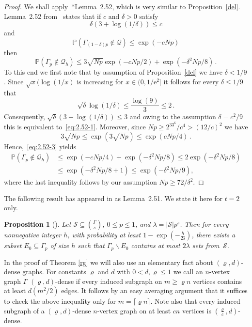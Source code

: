 \documentclass[reqno, 12pt]{amsart}
\let\setminus=\smallsetminus
\newcommand{\PP}{\mathds{P}}
\newtheorem{prop}[theorem]{Proposition}
\let\rho=\varrho
\def\PP{\mathds P}
\def\cQ{{\mathcal Q}}
\begin{document}
\begin{proof}
We shall apply~\cite{JLR}*{Lemma~2.52}, which is very similar to Proposition~\ref{del}. Lemma~2.52 from~\cite{JLR} states
that if $c$ and $\delta>0$ satisfy
\begin{equation}\label{eq:2.52-1}
    \delta(3+\log(1/\delta))\leq c
\end{equation}
and
\[
    \PP(\Gamma_{(1-\delta)p}\not\in\cQ)\le\exp(-cNp)
\]
then
\begin{equation}\label{eq:2.52-3}
    \PP(\Gamma_p\not\in\cQ_h)\le3\sqrt{Np}\exp(-cNp/2)+\exp(-\delta^2Np/8)\,.
\end{equation}
To this end we first note that by assumption of Proposition~\ref{del} we have $\delta <1/9$. Since
$\sqrt{x}(\log(1/x)$ is increasing for $x\in(0,1/\textrm{e}^2]$ it follows for every $\delta\le1/9$
that
\[
    \sqrt{\delta}\log(1/\delta)\leq\frac{\log(9)}{3} \leq 2\,.
\]
Consequently, $\sqrt{\delta}(3+\log(1/\delta))\leq 3$ and owing to the assumption $\delta=c^2/9$
this is equivalent to~\eqref{eq:2.52-1}.
Moreover,  since $Np\geq 2^33^6/c^4>(12/c)^2$ we have
$$
3\sqrt{Np}\le \exp({3\sqrt{Np}})\le \exp({cNp/4})\,.
$$
Hence,~\eqref{eq:2.52-3} yields
\begin{align*}
   \PP(\Gamma_p\not\in\cQ_h)&\le \exp(-cNp/4)+\exp(-\delta^2Np/8)
    \le
    2\exp(-\delta^2Np/8)\\
    &\le
    \exp(-\delta^2Np/8+1)\le \exp(-\delta^2Np/9),
\end{align*}
where the last inequality follows by our  assumption $Np\geq 72/\delta^2$. 
\end{proof}


The following result has appeared in \cite{JLR} as Lemma~2.51.  We state it here for $t=2$ only.
\begin{prop}[{\cite{JLR}}]\label{upper}
Let $\mathcal S\subseteq\binom\Gamma s$, $0\le p\le 1$, and $\lambda=|\mathcal S|p^s$. Then for every nonnegative integer $h$, with probability at least $1-\exp(-\tfrac{h}{2s})$, there exists a subset $E_0\subseteq \Gamma_p$ of size $h$ such that $\Gamma_p\setminus E_0$ contains at most $2\lambda$ sets from~$\mathcal S$.
\end{prop}

In the proof of Theorem \ref{rg} we will also use an elementary fact about $(\rho,d)$-dense graphs. For constants $\rho$ and $d$  with $0<d,\rho\le 1$ we call an
$n$-vertex  graph $\Gamma$ $(\rho,d)$-dense if every induced subgraph on  $m\ge \rho n$ vertices
contains at least $d(m^2/2)$ edges. It follows by an easy averaging argument that it suffices to
check the above inequality only for $m=\lceil \rho n\rceil$. Note also that every induced subgraph
of a $(\rho,d)$-dense $n$-vertex graph on at least $cn$ vertices is $(\tfrac{\rho}c,d)$-dense.
\end{document}
